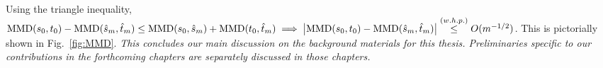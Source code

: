 Using the triangle inequality, $\textup{MMD}(s_0, t_0)-\textup{MMD}(\hat{s}_m, \hat{t}_m)\leq \textup{MMD}(s_0, \hat{s}_m) + \textup{MMD}(t_0, \hat{t}_m) \implies \left|\textup{MMD}(s_0, t_0)-\textup{MMD}(\hat{s}_m, \hat{t}_m)\right| \stackrel{(w.h.p.)}{\leq} O(m^{-1/2})$. This is pictorially shown in Fig.~\ref{fig:MMD}.
\newline
\newline
\textit{This concludes our main discussion on the background materials for this thesis. Preliminaries specific to our contributions in the forthcoming chapters are separately discussed in those chapters.}